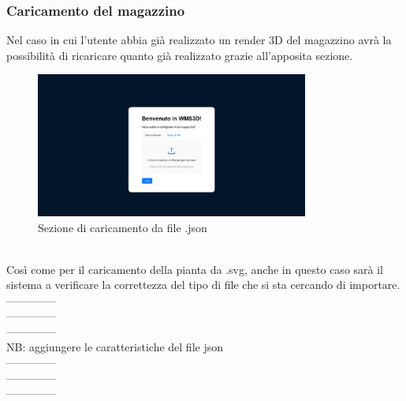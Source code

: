         \subsubsection{Caricamento del magazzino}\label{sec:creazione:caricamento}
            Nel caso in cui l'utente abbia già realizzato un render 3D del magazzino avrà la possibilità di ricaricare quanto già realizzato grazie all'apposita sezione. 
            \begin{figure}[h!]
                \centering
                \includegraphics[width=0.8\textwidth]{images/caricamento.png}
                \caption{Sezione di caricamento da file .json}
            \end{figure}\\
            \noindent Così come per il caricamento della pianta da .svg, anche in questo caso sarà il sistema a verificare la correttezza del tipo di file che si sta cercando 
            di importare. \\
            --------------\\
            --------------\\
            --------------\\
            NB: aggiungere le caratteristiche del file json\\
            --------------\\
            --------------\\
            --------------\\
    \newpage        

